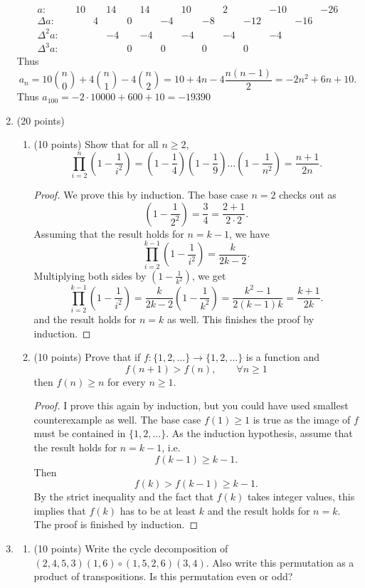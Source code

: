 \documentclass[12pt]{article}
\begin{document}
\begin{enumerate}
\[
\begin{array}{rcccccccccccccc}
a:&&10&&14&&14&&10&&2&&-10&&-26\\
\Delta a:&&&4&&0&&-4&&-8&&-12&&-16&\\
\Delta^2 a:&&&&-4&&-4&&-4&&-4&&-4&&\\
\Delta^3 a:&&&&&0&&0&&0&&0&&&
\end{array}
\]
Thus
\[
a_n=10\binom{n}{0}+4\binom{n}{1}-4\binom{n}{2}=10+4n-4\frac{n(n-1)}{2}=-2n^2+6n+10.
\]
Thus $a_{100}=-2\cdot 10000+600+10=-19390$
\newpage 
\item (20 points)
\begin{enumerate}
\item (10 points) Show that for all $n\geq 2$,
\[
\prod_{i=2}^{n}\left(1-\frac{1}{i^2}\right)=\left(1-\frac{1}{4}\right)\left(1-\frac{1}{9}\right)\dots\left(1-\frac{1}{n^2}\right)=\frac{n+1}{2n}.
\]
\begin{proof}
We prove this by induction. The base case $n=2$ checks out as
\[
\left(1-\frac{1}{2^2}\right)=\frac{3}{4}=\frac{2+1}{2\cdot 2}.
\]
Assuming that the result holds for $n=k-1$, we have
\[
\prod_{i=2}^{k-1}\left(1-\frac{1}{i^2}\right)=\frac{k}{2k-2}.
\]
Multiplying both sides by $\left(1-\frac{1}{k^2}\right)$, we get
\[
\prod_{i=2}^{k-1}\left(1-\frac{1}{i^2}\right)=\frac{k}{2k-2}\left(1-\frac{1}{k^2}\right)=\frac{k^2-1}{2(k-1)k}=\frac{k+1}{2k}.
\]
and the result holds for $n=k$ as well. This finishes the proof by induction.
\end{proof}
\item (10 points) Prove that if $f:\{1,2,\dots\}\to \{1,2,\dots\}$ is a function and
\[
f(n+1)>f(n),\qquad\forall n\geq 1
\]
then $f(n)\geq n$ for every $n\geq 1$.
\begin{proof}
I prove this again by induction, but you could have used smallest counterexample as well. The base case $f(1)\geq 1$ is true as the image of $f$ must be contained in $\{1,2,\dots\}$. As the induction hypothesis, assume that the result holds for $n=k-1$, i.e.
\[
f(k-1)\geq k-1.
\]
Then 
\[
f(k)>f(k-1)\geq k-1.
\]
By the strict inequality and the fact that $f(k)$ takes integer values, this implies that $f(k)$ has to be at least $k$ and the result holds for $n=k$. The proof is finished by induction.
\end{proof}
\end{enumerate}
\newpage
\item 
\begin{enumerate}
\item (10 points) Write the cycle decomposition of $(2,4,5,3)(1,6)\circ (1,5,2,6)(3,4)$. Also write this permutation as a product of transpositions. Is this permutation even or odd?


\end{enumerate}
\end{enumerate}
\end{document}
